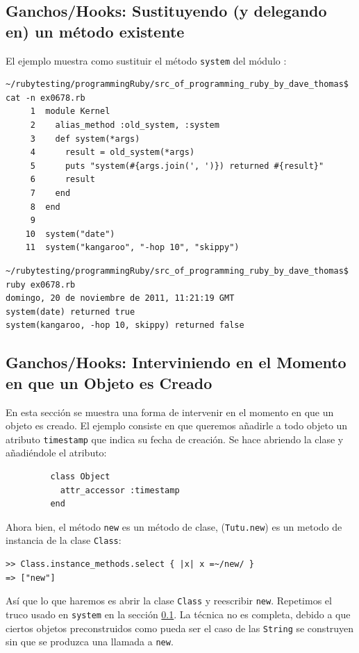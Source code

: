 \subsection{Ganchos/Hooks: Sustituyendo (y delegando en) un método existente}
\label{subsection:hooks}
El ejemplo muestra como sustituir el método \verb|system| del módulo :
\begin{verbatim}
~/rubytesting/programmingRuby/src_of_programming_ruby_by_dave_thomas$ cat -n ex0678.rb 
     1  module Kernel
     2    alias_method :old_system, :system
     3    def system(*args)
     4      result = old_system(*args)
     5      puts "system(#{args.join(', ')}) returned #{result}"
     6      result
     7    end
     8  end
     9  
    10  system("date")
    11  system("kangaroo", "-hop 10", "skippy")
\end{verbatim}

\begin{verbatim}
~/rubytesting/programmingRuby/src_of_programming_ruby_by_dave_thomas$ ruby ex0678.rb 
domingo, 20 de noviembre de 2011, 11:21:19 GMT
system(date) returned true
system(kangaroo, -hop 10, skippy) returned false
\end{verbatim}


\subsection{Ganchos/Hooks: Interviniendo en el Momento en que un Objeto es Creado}
En esta sección se muestra una forma de intervenir en el momento en que un objeto es creado.
El ejemplo consiste en que queremos añadirle a todo objeto un atributo \verb|timestamp|
que indica su fecha de creación.
Se hace abriendo la clase  y añadiéndole el atributo:

\begin{verbatim}
         class Object
           attr_accessor :timestamp
         end
\end{verbatim}
Ahora bien, el método \verb|new| es un método de clase, (\verb|Tutu.new|)
es un metodo de instancia de la clase \verb|Class|:
\begin{verbatim}
>> Class.instance_methods.select { |x| x =~/new/ }
=> ["new"]
\end{verbatim}
Así que lo que haremos es abrir la clase \verb|Class| y reescribir \verb|new|.
Repetimos el truco usado en \verb|system| en la sección 
\ref{subsection:hooks}.
La técnica no es completa, debido a que ciertos objetos preconstruidos como pueda ser el caso de las \verb|String| se construyen sin que se produzca una llamada a \verb|new|.

